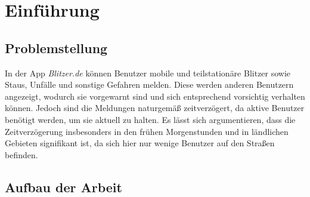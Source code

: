 \section{Einführung}
\label{sec:Einführung}

\subsection{Problemstellung}
\label{sec:Problemstellung}
In der App \emph{Blitzer.de} können Benutzer mobile und teilstationäre Blitzer sowie Staus, Unfälle und sonstige Gefahren melden.
Diese werden anderen Benutzern angezeigt, wodurch sie vorgewarnt sind und sich entsprechend vorsichtig verhalten können.
Jedoch sind die Meldungen naturgemäß zeitverzögert, da aktive Benutzer benötigt werden, um sie aktuell zu halten.
Es lässt sich argumentieren, dass die Zeitverzögerung insbesonders in den frühen Morgenstunden und in ländlichen Gebieten signifikant ist,
da sich hier nur wenige Benutzer auf den Straßen befinden.



\subsection{Aufbau der Arbeit}
\label{sec:Aufbau}




